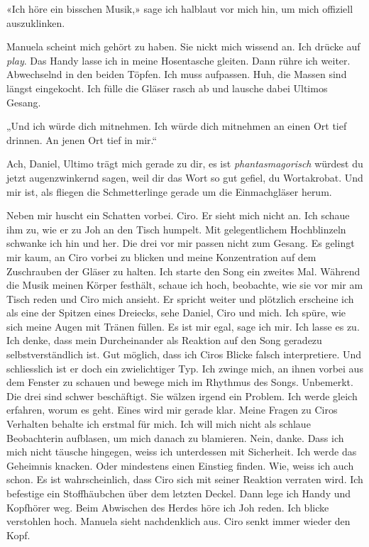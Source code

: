 «Ich höre ein bisschen Musik,» sage ich halblaut vor mich hin, um mich
offiziell auszuklinken.

Manuela scheint mich gehört zu haben. Sie nickt mich wissend an. Ich
drücke auf \emph{play}. Das Handy lasse ich in meine Hosentasche
gleiten. Dann rühre ich weiter. Abwechselnd in den beiden Töpfen. Ich
muss aufpassen. Huh, die Massen sind längst eingekocht. Ich fülle die
Gläser rasch ab und lausche dabei Ultimos Gesang.



„Und ich würde dich mitnehmen.
Ich würde dich mitnehmen an einen Ort tief drinnen. 
An jenen Ort tief in mir.“

Ach, Daniel, Ultimo trägt mich gerade zu dir, es ist
\emph{phantasmagorisch} würdest du jetzt augenzwinkernd sagen, weil dir
das Wort so gut gefiel, du Wortakrobat. Und mir ist, als fliegen die
Schmetterlinge gerade um die Einmachgläser herum.

Neben mir huscht ein Schatten vorbei. Ciro. Er sieht mich nicht an. Ich
schaue ihm zu, wie er zu Joh an den Tisch humpelt.
Mit gelegentlichem Hochblinzeln schwanke ich hin und her. Die drei vor
mir passen nicht zum Gesang.
Es gelingt mir kaum, an Ciro vorbei zu blicken und meine Konzentration
auf dem Zuschrauben der Gläser zu halten.
Ich starte den Song ein zweites Mal. Während die Musik meinen Körper
festhält, schaue ich hoch, beobachte, wie sie vor mir am Tisch reden und
Ciro mich ansieht. Er spricht weiter und plötzlich erscheine ich als eine der Spitzen eines Dreiecks, sehe Daniel, Ciro und mich. Ich spüre, wie sich meine Augen mit Tränen füllen. Es ist mir egal, sage ich mir. Ich lasse es zu. Ich denke, dass mein Durcheinander als Reaktion auf den Song geradezu selbstverständlich ist. Gut möglich, dass ich Ciros Blicke falsch interpretiere. Und schliesslich ist er doch ein zwielichtiger Typ.
Ich zwinge mich, an ihnen vorbei aus dem Fenster zu schauen und bewege mich im Rhythmus des Songs.
Unbemerkt. Die drei sind schwer beschäftigt. Sie wälzen irgend ein Problem. Ich
werde gleich erfahren, worum es geht.
Eines wird mir gerade klar. Meine Fragen zu Ciros Verhalten behalte ich
erstmal für mich. Ich will mich nicht als schlaue Beobachterin
aufblasen, um mich danach zu blamieren. Nein, danke. Dass ich mich nicht
täusche hingegen, weiss ich unterdessen mit Sicherheit. Ich werde das
Geheimnis knacken. Oder mindestens einen Einstieg finden. Wie, weiss ich
auch schon. Es ist wahrscheinlich, dass Ciro sich mit seiner Reaktion
verraten wird.
Ich befestige ein Stoffhäubchen über dem letzten Deckel. Dann lege ich
Handy und Kopfhörer weg. Beim Abwischen des Herdes höre ich Joh reden.
Ich blicke verstohlen hoch. Manuela sieht nachdenklich aus. Ciro senkt
immer wieder den Kopf.

